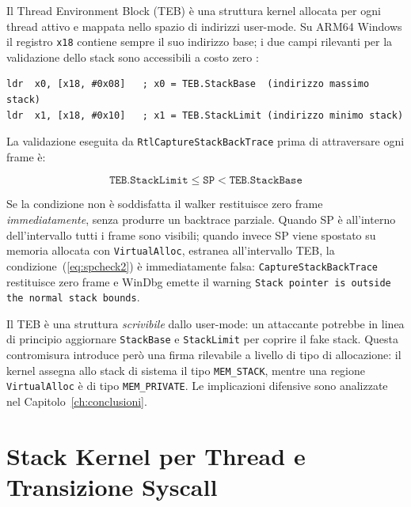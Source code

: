 Il Thread Environment Block (TEB) è una struttura kernel allocata per ogni
thread attivo e mappata nello spazio di indirizzi user-mode. Su ARM64 Windows
il registro \texttt{x18} contiene sempre il suo indirizzo base; i due campi
rilevanti per la validazione dello stack sono accessibili a costo zero
\cite{winternals7}:

\begin{lstlisting}[style=asmstyle, language=ARM64, caption={Accesso a \texttt{StackBase} e \texttt{StackLimit} dal TEB su ARM64 Windows},
label={lst:teb-access}]
ldr  x0, [x18, #0x08]   ; x0 = TEB.StackBase  (indirizzo massimo stack)
ldr  x1, [x18, #0x10]   ; x1 = TEB.StackLimit (indirizzo minimo stack)
\end{lstlisting}

La validazione eseguita da \texttt{RtlCaptureStackBackTrace} prima di
attraversare ogni frame è:

\begin{equation}
\texttt{TEB.StackLimit} \leq \texttt{SP} < \texttt{TEB.StackBase}
\label{eq:spcheck2}
\end{equation}

Se la condizione non è soddisfatta il walker restituisce zero frame
\emph{immediatamente}, senza produrre un backtrace parziale. Quando SP è
all'interno dell'intervallo tutti i frame sono visibili; quando invece SP
viene spostato su memoria allocata con \texttt{VirtualAlloc}, estranea
all'intervallo TEB, la condizione~(\ref{eq:spcheck2}) è immediatamente falsa:
\texttt{CaptureStackBackTrace} restituisce zero frame e WinDbg emette il
warning \texttt{Stack pointer is outside the normal stack bounds}.

Il TEB è una struttura \emph{scrivibile} dallo user-mode: un attaccante
potrebbe in linea di principio aggiornare \texttt{StackBase} e
\texttt{StackLimit} per coprire il fake stack. Questa contromisura introduce
però una firma rilevabile a livello di tipo di allocazione: il kernel assegna
allo stack di sistema il tipo \texttt{MEM\_STACK}, mentre una regione
\texttt{VirtualAlloc} è di tipo \texttt{MEM\_PRIVATE}. Le implicazioni
difensive sono analizzate nel Capitolo~\ref{ch:conclusioni}.


\section{Stack Kernel per Thread e Transizione Syscall}
\label{sec:kernel-stack}


